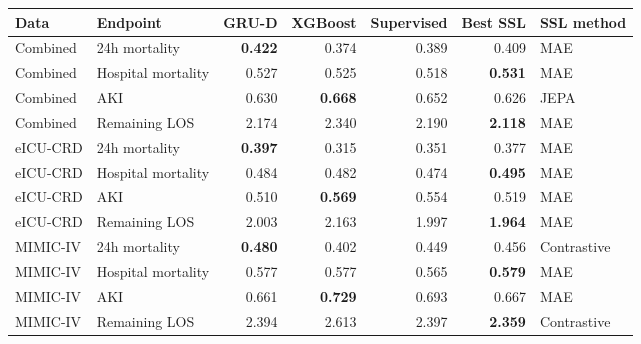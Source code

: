 \begin{tabular}{llrrrrl}
\toprule
Data & Endpoint & GRU-D & XGBoost & Supervised & Best SSL & SSL method \\
\midrule
Combined & 24h mortality & \textbf{0.422} & 0.374 & 0.389 & 0.409 & MAE \\
Combined & Hospital mortality & 0.527 & 0.525 & 0.518 & \textbf{0.531} & MAE \\
Combined & AKI & 0.630 & \textbf{0.668} & 0.652 & 0.626 & JEPA \\
Combined & Remaining LOS & 2.174 & 2.340 & 2.190 & \textbf{2.118} & MAE \\
eICU-CRD & 24h mortality & \textbf{0.397} & 0.315 & 0.351 & 0.377 & MAE \\
eICU-CRD & Hospital mortality & 0.484 & 0.482 & 0.474 & \textbf{0.495} & MAE \\
eICU-CRD & AKI & 0.510 & \textbf{0.569} & 0.554 & 0.519 & MAE \\
eICU-CRD & Remaining LOS & 2.003 & 2.163 & 1.997 & \textbf{1.964} & MAE \\
MIMIC-IV & 24h mortality & \textbf{0.480} & 0.402 & 0.449 & 0.456 & Contrastive \\
MIMIC-IV & Hospital mortality & 0.577 & 0.577 & 0.565 & \textbf{0.579} & MAE \\
MIMIC-IV & AKI & 0.661 & \textbf{0.729} & 0.693 & 0.667 & MAE \\
MIMIC-IV & Remaining LOS & 2.394 & 2.613 & 2.397 & \textbf{2.359} & Contrastive \\
\bottomrule
\end{tabular}
